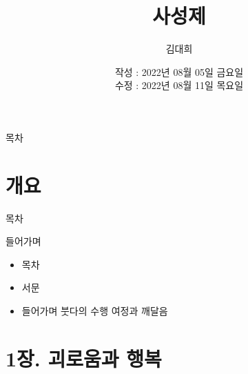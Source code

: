 \documentclass[aspectratio=1610,14pt,xcolor=pdftex,dvipsnames,table,handout]{beamer}
\begin{document}
	

			\title{사성제}

			\author{김대희}

			\date{	작성 : 2022년 08월 05일 금요일 \\
					수정 : 2022년 08월 11일 목요일 }



		\begin{frame}[plain]
		\titlepage
		\end{frame}



		\begin{frame} {목차}
		\tableofcontents
		\end{frame}

		\part{개요 }
		\frame{\partpage}


		\begin{frame} [plain]{목차}
		\tableofcontents
		\end{frame}
		
		\begin{frame} [t,plain]
			\begin{block} {들어가며}
			\begin{itemize}
				\item 목차
				\item 서문
				\item 들어가며  붓다의 수행 여정과 깨달음
			\end{itemize}
			\end{block}
		\end{frame}


		\part{1장. 괴로움과 행복}
		\frame{\partpage}
\end{document}

